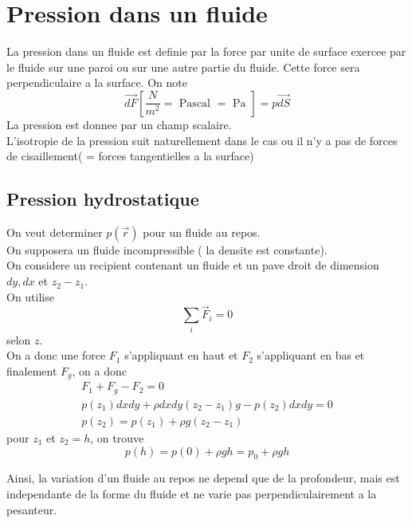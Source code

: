 \documentclass[../main.tex]{subfiles}
\begin{document}
\section{Pression dans un fluide}
La pression dans un fluide est definie par la force par unite de surface exercee par le fluide sur une paroi ou sur une autre partie du fluide. Cette force sera perpendiculaire a la surface. On note
\[ 
\vec{dF} \left[ \frac{N}{m^{2}} = \text{ Pascal } = \text{ Pa } \right]  = p \vec{dS}
\]
La pression est donnee par un champ scalaire.\\
L'isotropie de la pression suit naturellement dans le cas ou il n'y a pas de forces de cisaillement( = forces tangentielles a la surface) 

\subsection{Pression hydrostatique}
On veut determiner $p( \vec{r}) $ pour un fluide au repos.\\
On supposera un fluide incompressible ( la densite est constante).\\
On considere un recipient contenant un fluide et un pave droit de dimension $dy,dx$ et $z_2-z_1$.\\
On utilise
\[ 
	\sum_{i} \vec{F}_i = 0
\]
selon $z$.\\
On a donc une force $F_ 1$ s'appliquant en haut et $F_2$ s'appliquant en bas et finalement $F_g$, on a donc
\begin{align*}
F_1 + F_g - F_2 = 0\\
p( z_1) dx dy + \rho dx dy ( z_2-z_1) g - p( z_2) dx dy = 0\\
p( z_2) = p( z_1 ) + \rho g ( z_2 -z_1)
\end{align*}
pour $z_1$ et $z_2 = h$, on trouve
\[ 
	p( h) = p( 0) + \rho g h = p_{0} + \rho g h
\]

Ainsi, la variation d'un fluide au repos ne depend que de la profondeur, mais est independante de la forme du fluide et ne varie pas perpendiculairement a la pesanteur.
\end{document}
